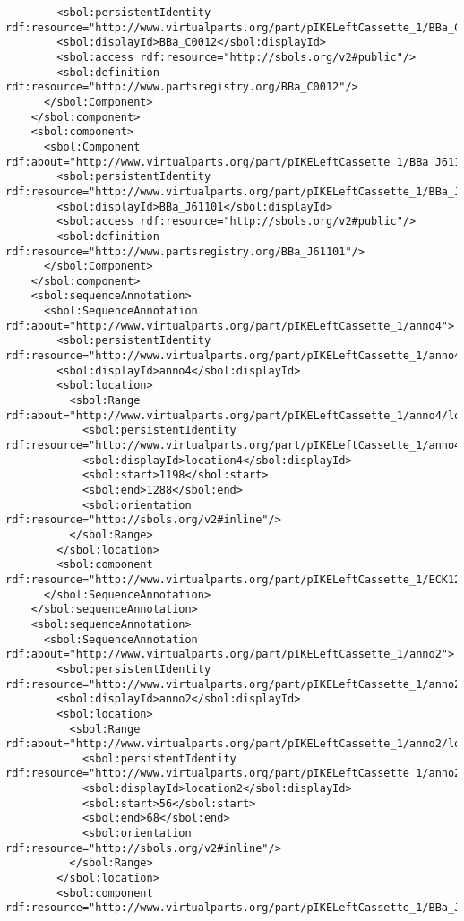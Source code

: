 \begin{lstlisting}
        <sbol:persistentIdentity rdf:resource="http://www.virtualparts.org/part/pIKELeftCassette_1/BBa_C0012"/>
        <sbol:displayId>BBa_C0012</sbol:displayId>
        <sbol:access rdf:resource="http://sbols.org/v2#public"/>
        <sbol:definition rdf:resource="http://www.partsregistry.org/BBa_C0012"/>
      </sbol:Component>
    </sbol:component>
    <sbol:component>
      <sbol:Component rdf:about="http://www.virtualparts.org/part/pIKELeftCassette_1/BBa_J61101">
        <sbol:persistentIdentity rdf:resource="http://www.virtualparts.org/part/pIKELeftCassette_1/BBa_J61101"/>
        <sbol:displayId>BBa_J61101</sbol:displayId>
        <sbol:access rdf:resource="http://sbols.org/v2#public"/>
        <sbol:definition rdf:resource="http://www.partsregistry.org/BBa_J61101"/>
      </sbol:Component>
    </sbol:component>
    <sbol:sequenceAnnotation>
      <sbol:SequenceAnnotation rdf:about="http://www.virtualparts.org/part/pIKELeftCassette_1/anno4">
        <sbol:persistentIdentity rdf:resource="http://www.virtualparts.org/part/pIKELeftCassette_1/anno4"/>
        <sbol:displayId>anno4</sbol:displayId>
        <sbol:location>
          <sbol:Range rdf:about="http://www.virtualparts.org/part/pIKELeftCassette_1/anno4/location4">
            <sbol:persistentIdentity rdf:resource="http://www.virtualparts.org/part/pIKELeftCassette_1/anno4/location4"/>
            <sbol:displayId>location4</sbol:displayId>
            <sbol:start>1198</sbol:start>
            <sbol:end>1288</sbol:end>
            <sbol:orientation rdf:resource="http://sbols.org/v2#inline"/>
          </sbol:Range>
        </sbol:location>
        <sbol:component rdf:resource="http://www.virtualparts.org/part/pIKELeftCassette_1/ECK120029600"/>
      </sbol:SequenceAnnotation>
    </sbol:sequenceAnnotation>
    <sbol:sequenceAnnotation>
      <sbol:SequenceAnnotation rdf:about="http://www.virtualparts.org/part/pIKELeftCassette_1/anno2">
        <sbol:persistentIdentity rdf:resource="http://www.virtualparts.org/part/pIKELeftCassette_1/anno2"/>
        <sbol:displayId>anno2</sbol:displayId>
        <sbol:location>
          <sbol:Range rdf:about="http://www.virtualparts.org/part/pIKELeftCassette_1/anno2/location2">
            <sbol:persistentIdentity rdf:resource="http://www.virtualparts.org/part/pIKELeftCassette_1/anno2/location2"/>
            <sbol:displayId>location2</sbol:displayId>
            <sbol:start>56</sbol:start>
            <sbol:end>68</sbol:end>
            <sbol:orientation rdf:resource="http://sbols.org/v2#inline"/>
          </sbol:Range>
        </sbol:location>
        <sbol:component rdf:resource="http://www.virtualparts.org/part/pIKELeftCassette_1/BBa_J61101"/>

\end{lstlisting}
